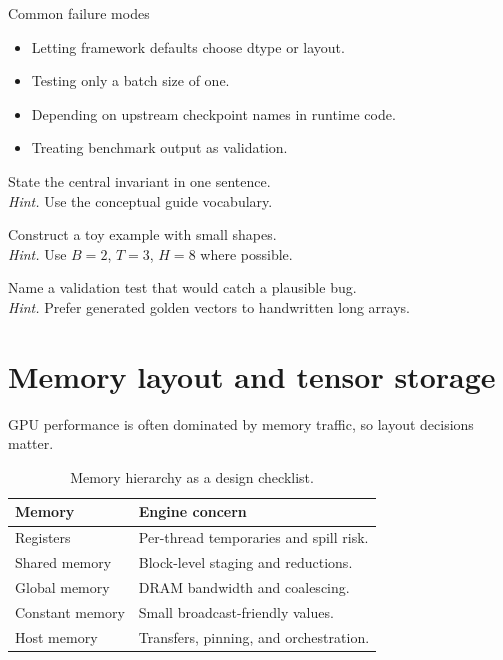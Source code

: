 \begin{warningbox}{Common failure modes}
\begin{itemize}
\item Letting framework defaults choose dtype or layout.
\item Testing only a batch size of one.
\item Depending on upstream checkpoint names in runtime code.
\item Treating benchmark output as validation.
\end{itemize}
\end{warningbox}

\begin{chapterexercises}
\item State the central invariant in one sentence.\\
\textit{Hint.} Use the conceptual guide vocabulary.
\item Construct a toy example with small shapes.\\
\textit{Hint.} Use $B=2$, $T=3$, $H=8$ where possible.
\item Name a validation test that would catch a plausible bug.\\
\textit{Hint.} Prefer generated golden vectors to handwritten long arrays.
\end{chapterexercises}

\chapter{Memory layout and tensor storage}
\label{ch:gpu-memory-layout}
GPU performance is often dominated by memory traffic, so layout decisions matter.

\begin{table}[htbp]\centering\small
\begin{tabularx}{\textwidth}{L{0.22\textwidth}Y}
\toprule
Memory & Engine concern \\
\midrule
Registers & Per-thread temporaries and spill risk. \\
Shared memory & Block-level staging and reductions. \\
Global memory & DRAM bandwidth and coalescing. \\
Constant memory & Small broadcast-friendly values. \\
Host memory & Transfers, pinning, and orchestration. \\
\bottomrule
\end{tabularx}
\caption{Memory hierarchy as a design checklist.}
\end{table}

